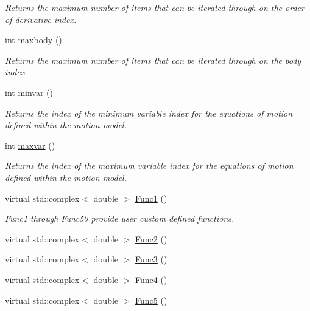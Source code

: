 \begin{DoxyCompactItemize}
\begin{DoxyCompactList}\small\item\em Returns the maximum number of items that can be iterated through on the order of derivative index. \end{DoxyCompactList}\item 
int \hyperlink{classosea_1_1ofreq_1_1_equationof_motion_a0fea5098961fce0004b978223b4a501b}{maxbody} ()
\begin{DoxyCompactList}\small\item\em Returns the maximum number of items that can be iterated through on the body index. \end{DoxyCompactList}\item 
int \hyperlink{classosea_1_1ofreq_1_1_equationof_motion_ae6d9759a5bff736e3876930c1357738a}{minvar} ()
\begin{DoxyCompactList}\small\item\em Returns the index of the minimum variable index for the equations of motion defined within the motion model. \end{DoxyCompactList}\item 
int \hyperlink{classosea_1_1ofreq_1_1_equationof_motion_a8c6367e13c8f027f4a0936b821ff9363}{maxvar} ()
\begin{DoxyCompactList}\small\item\em Returns the index of the maximum variable index for the equations of motion defined within the motion model. \end{DoxyCompactList}\item 
virtual std\-::complex$<$ double $>$ \hyperlink{classosea_1_1ofreq_1_1_equationof_motion_af83fcd0f9089a49f0b36e1af79b66922}{Func1} ()
\begin{DoxyCompactList}\small\item\em Func1 through Func50 provide user custom defined functions. \end{DoxyCompactList}\item 
virtual std\-::complex$<$ double $>$ \hyperlink{classosea_1_1ofreq_1_1_equationof_motion_accd87271595a2eac0dc116285479ecff}{Func2} ()
\item 
virtual std\-::complex$<$ double $>$ \hyperlink{classosea_1_1ofreq_1_1_equationof_motion_ad63157443d3a7b67ec961a8642f895e4}{Func3} ()
\item 
virtual std\-::complex$<$ double $>$ \hyperlink{classosea_1_1ofreq_1_1_equationof_motion_a6e604ceb9f5147327d51099ca9cc862b}{Func4} ()
\item 
virtual std\-::complex$<$ double $>$ \hyperlink{classosea_1_1ofreq_1_1_equationof_motion_af8950ca2b293588b39b169bc18f6864d}{Func5} ()

\end{DoxyCompactItemize}
